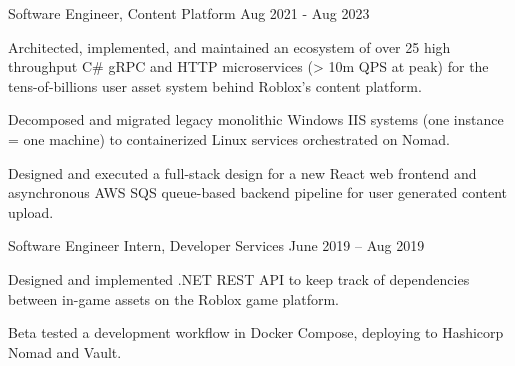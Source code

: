 \documentclass[]{awesome-cv}
\begin{document}
	\vspace{-5mm}
	\cventry
	{Software Engineer, Content Platform}
	{}
	{}
	{Aug 2021 - Aug 2023}
	{\begin{cvitems}
		\item{Architected, implemented, and maintained an ecosystem of over 25 high throughput C\# gRPC and HTTP microservices (> 10m QPS at peak)  for the tens-of-billions user asset system behind Roblox's content platform.}
		\item{Decomposed and migrated legacy monolithic Windows IIS systems (one instance = one machine) to containerized Linux services orchestrated on Nomad.}
		\item{Designed and executed a full-stack design for a new React web frontend and asynchronous AWS SQS queue-based backend pipeline for user generated content upload.}
	\end{cvitems}}

	\vspace{-5mm}
	\cventry
	{Software Engineer Intern, Developer Services}
	{}
	{}
	{June 2019 – Aug 2019}
	{\begin{cvitems}
		\item {Designed and implemented .NET REST API to keep track of dependencies between in-game assets on the Roblox game platform.}
		\item {Beta tested a development workflow in Docker Compose, deploying to Hashicorp Nomad and Vault.}
	\end{cvitems}}


\end{document}
